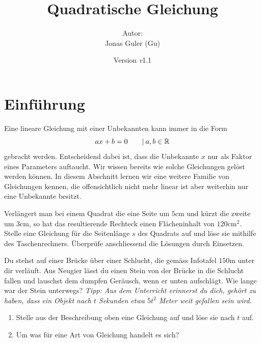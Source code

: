 \documentclass[11pt,oneside]{article}
\newcommand{\Skriptname}{Quadratische Gleichung}
\newcommand{\Autor}{Jonas Guler (Gu)}
\newcommand{\version}{\textit{v}1.1}
\begin{document}
\begin{titlepage}
	\clearpage
	\title{\Huge\textbf{\Skriptname} \\[1cm]}
	\author{Autor:\\ \Autor}
	\date{\normalsize {Version \version}\\ \datelong}
	\maketitle
	\thispagestyle{empty}
	\vfill
	\tableofcontents
\end{titlepage}
\section{Einführung}
	Eine lineare Gleichung mit einer Unbekannten kann immer in die Form \[ax+b=0 \qquad\vert\:a,b\in\mathbb{R}\] gebracht werden. Entscheidend dabei ist, dass die Unbekannte $x$ nur als Faktor eines Parameters auftaucht. Wir wissen bereits wie solche Gleichungen gelöst werden können. In diesem Abschnitt lernen wir eine weitere Familie von Gleichungen kennen, die offensichtlich nicht mehr linear ist aber weiterhin nur eine Unbekannte besitzt.
	\begin{aufgabe}
		Verlängert man bei einem Quadrat die eine Seite um $5$cm und kürzt die zweite um $3$cm, so hat das resultierende Rechteck einen Flächeninhalt von $120$cm$^2$. Stelle eine Gleichung für die Seitenlänge $s$ des Quadrats auf und löse sie mithilfe des Taschenrechners. Überprüfe anschliessend die Lösungen durch Einsetzen.\vspace{5pt}\newline
	\end{aufgabe}
	\begin{aufgabe}
		\label{aufg:fallenderStein}
		Du stehst auf einer Brücke über einer Schlucht, die gemäss Infotafel $150$m unter dir verläuft. Aus Neugier lässt du einen Stein von der Brücke in die Schlucht fallen und lauschst dem dumpfen Geräusch, wenn er unten aufschlägt. Wie lange war der Stein unterwegs?\newline
		\textit{Tipp: Aus dem Unterricht erinnerst du dich, gehört zu haben, dass ein Objekt nach $t$ Sekunden etwa $5t^2$ Meter weit gefallen sein wird.}
		\begin{enumerate}[label=\alph*)]
			\item Stelle aus der Beschreibung oben eine Gleichung auf und löse sie nach $t$ auf.
			\item Um was für eine Art von Gleichung handelt es sich?
		\end{enumerate}
		\karos{5}
	\end{aufgabe}
\end{document}

